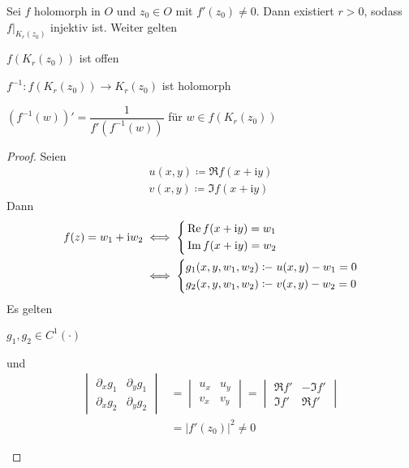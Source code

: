 \begin{theorem} \label{thm:3.6}
  Sei $f$ holomorph in $O$ und $z_0 \in O$ mit $f'(z_0) \neq 0$. Dann existiert $r > 0$, sodass $f\Big|_{K_r(z_0)}$ injektiv ist. Weiter gelten
  \begin{item-triangle}
    \item $f(K_r(z_0))$ ist offen
    
    \item $f^{-1} : f(K_r(z_0)) \to K_r(z_0)$ ist holomorph
    
    \item $(f^{-1}(w))' = \dfrac{1}{f'(f^{-1}(w))}$ für $w \in f(K_r(z_0))$
  \end{item-triangle}
  
  \begin{proof}
    Seien
    \begin{align*}
      u(x,y) \coloneq \Re f(x+\mathrm{i}y) \\
      v(x,y) \coloneq \Im f(x+\mathrm{i}y)
    \end{align*}
    Dann
    \begin{align*}
      f(z) = w_1 + \mathrm{i} w_2 &\iff
      \begin{dcases}
        \Re f(x+\mathrm{i}y) = w_1 \\
        \Im f(x+\mathrm{i}y) = w_2
      \end{dcases}
      \\
      &\iff
      \begin{dcases}
        g_1(x,y,w_1,w_2) \coloneq u(x,y) - w_1 = 0 \\
        g_2(x,y,w_1,w_2) \coloneq v(x,y) - w_2 = 0
      \end{dcases}
    \end{align*}
    Es gelten
    \begin{enum-arab}
      \item $g_1,g_2 \in C^1(\cdot)$
      
      \item und
      \begin{align*}
        \begin{vmatrix}
          \partial_x g_1 & \partial_y g_1 \\
          \partial_x g_2 & \partial_y g_2
        \end{vmatrix}
        &=
        \begin{vmatrix}
          u_x & u_y \\
          v_x & v_y
        \end{vmatrix}
        =
        \begin{vmatrix}
          \Re f' & -\Im f' \\
          \Im f' & \Re f'
        \end{vmatrix}
        \\
        &= |f'(z_0)|^2 \neq 0
      \end{align*}
      

\end{enum-arab}
\end{proof}
\end{theorem}
